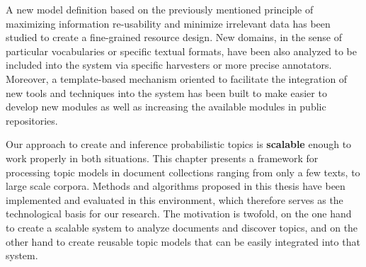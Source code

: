 A new model definition based on the previously mentioned principle of maximizing information re-usability and minimize irrelevant data has been studied to create a fine-grained resource design. New domains, in the sense of particular vocabularies or specific textual formats, have been also analyzed to be included into the system via specific harvesters or more precise annotators. Moreover, a template-based mechanism oriented to facilitate the integration of new tools and techniques into the system has been built to make easier to develop new modules as well as increasing the available modules in public repositories.

Our approach to create and inference probabilistic topics is \textbf{scalable} enough to work properly in both situations. This chapter presents a framework for processing topic models in document collections ranging from only a few texts, to large scale corpora. Methods and algorithms proposed in this thesis have been implemented and evaluated in this environment, which therefore serves as the technological basis for our research. The motivation is twofold, on the one hand to create a scalable system to analyze documents and discover topics, and on the other hand to create reusable topic models that can be easily integrated into that system.
